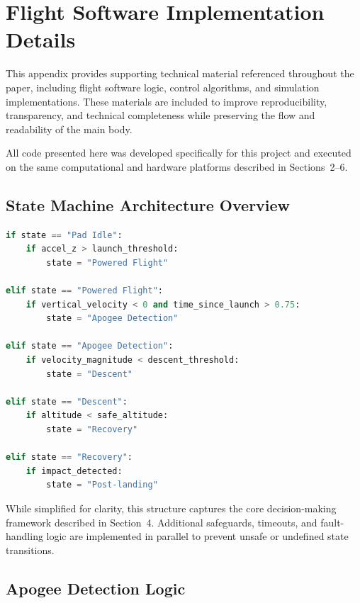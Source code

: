 \section{Flight Software Implementation Details}
\label{sec:appendix_a}

This appendix provides supporting technical material referenced throughout the paper, including
flight software logic, control algorithms, and simulation implementations. These materials are
included to improve reproducibility, transparency, and technical completeness while preserving
the flow and readability of the main body.

All code presented here was developed specifically for this project and executed on the same
computational and hardware platforms described in Sections~2--6.

\subsection{State Machine Architecture Overview}
\label{subsec:app_statemachine}

\begin{lstlisting}[language=Python, caption={High-level autonomous flight state machine.},
                   label=lst:statemachine]
if state == "Pad Idle":
    if accel_z > launch_threshold:
        state = "Powered Flight"

elif state == "Powered Flight":
    if vertical_velocity < 0 and time_since_launch > 0.75:
        state = "Apogee Detection"

elif state == "Apogee Detection":
    if velocity_magnitude < descent_threshold:
        state = "Descent"

elif state == "Descent":
    if altitude < safe_altitude:
        state = "Recovery"

elif state == "Recovery":
    if impact_detected:
        state = "Post-landing"
\end{lstlisting}

While simplified for clarity, this structure captures the core decision-making framework described
in Section~4. Additional safeguards, timeouts, and fault-handling logic are implemented in parallel
to prevent unsafe or undefined state transitions.

\subsection{Apogee Detection Logic}
\label{subsec:app_apogee}

